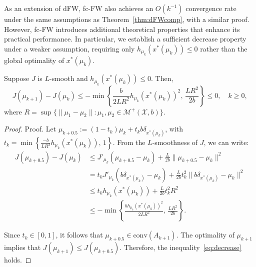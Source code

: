 \documentclass[stsy,sglanonrev]{informs4}
\begin{document}
As an extension of dFW, fc-FW also achieves an \( O(k^{-1}) \) convergence rate under the same assumptions as Theorem~\ref{thm:dFWcomp}, with a similar proof. However, fc-FW introduces additional theoretical properties that enhance its practical performance. In particular, we establish a sufficient decrease property under a weaker assumption, requiring only \( h_{\mu_k}(x^*(\mu_k)) \leq 0 \) rather than the global optimality of \( x^*(\mu_k) \).

\begin{lemma}\label{lemma:decrease}
Suppose \(J\) is \(L\)-smooth and \(h_{\mu_k}(x^*(\mu_k)) \leq 0\). Then,
\begin{equation}\label{eq:decrease}
    J(\mu_{k+1}) - J(\mu_k) \leq - \min \left\{ \frac{b}{2LR^2}h_{\mu_k}(x^*(\mu_k))^2, \, \frac{LR^2}{2b} \right\}\leq 0, \quad k \geq 0,
\end{equation}
where \(R = \sup\{\|\mu_1-\mu_2\| : \mu_1, \mu_2 \in \mathcal{M}^+(\mathcal{X},b)\}.\)
\end{lemma}

\begin{proof}{Proof.}
Let \(\mu_{k+0.5} := (1-t_k)\mu_k + t_kb\delta_{x^*(\mu_k)}\), with \(t_k = \min \left\{ \frac{-b}{LR^2}h_{\mu_k}(x^*(\mu_k)), \, 1\right\}\). From the \(L\)-smoothness of \(J\), we can write:
\begin{align}
    J(\mu_{k+0.5}) - J(\mu_k) &\leq J'_{\mu_k}(\mu_{k+0.5} - \mu_k) + \frac{L}{2b}\|\mu_{k+0.5} - \mu_k\|^2 \nonumber \\
    &= t_k J'_{\mu_k}(b\delta_{x^*(\mu_k)} - \mu_k) + \frac{L}{2b}t_k^2\|b\delta_{x^*(\mu_k)} - \mu_k\|^2 \nonumber \\
    &\leq t_k h_{\mu_k}(x^*(\mu_k)) + \frac{L}{2b}t_k^2 R^2 \nonumber \\
    &\leq - \min \left\{ \frac{bh_{\mu_k}(x^*(\mu_k))^2}{2LR^2}, \, \frac{LR^2}{2b} \right\}.
\end{align}

Since \(t_k \in [0,1]\), it follows that \(\mu_{k+0.5} \in \mathrm{conv}(A_{k+1})\). The optimality of \(\mu_{k+1}\) implies that \(J(\mu_{k+1}) \leq J(\mu_{k+0.5})\). Therefore, the inequality~\eqref{eq:decrease} holds.
\hfill \Halmos
\end{proof}
\end{document}
